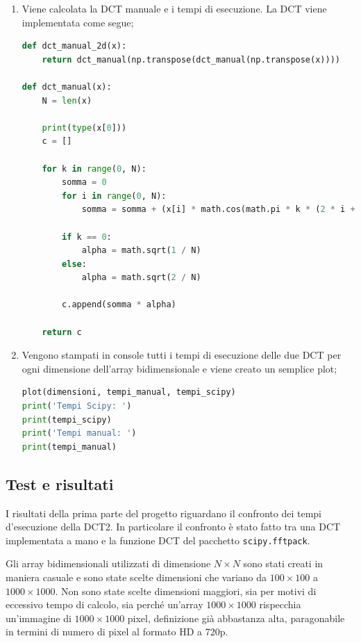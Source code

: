 \documentclass[preprint,12pt]{elsarticle}
\begin{document}
\begin{enumerate}
\item Viene calcolata la DCT manuale e i tempi di esecuzione. La DCT viene implementata come segue;
\begin{lstlisting}[language=Python]
def dct_manual_2d(x):
    return dct_manual(np.transpose(dct_manual(np.transpose(x))))
    
def dct_manual(x):
    N = len(x)

    print(type(x[0]))
    c = []
    
    for k in range(0, N):
        somma = 0
        for i in range(0, N):
            somma = somma + (x[i] * math.cos(math.pi * k * (2 * i + 1) / (2 * N)))
    
        if k == 0:
            alpha = math.sqrt(1 / N)
        else:
            alpha = math.sqrt(2 / N)
            
        c.append(somma * alpha)
            
    return c
\end{lstlisting}

\item Vengono stampati in console tutti i tempi di esecuzione delle due DCT per ogni dimensione dell'array bidimensionale e viene creato un semplice plot;
\begin{lstlisting}[language=Python]
plot(dimensioni, tempi_manual, tempi_scipy)
print('Tempi Scipy: ')
print(tempi_scipy)
print('Tempi manual: ')
print(tempi_manual)
\end{lstlisting}


\end{enumerate}

\newpage


\subsection*{Test e risultati}
I risultati della prima parte del progetto riguardano il confronto dei tempi d'esecuzione della DCT2. In particolare il confronto è stato fatto tra una DCT implementata a mano e la funzione DCT del pacchetto \texttt{scipy.fftpack}.

Gli array bidimensionali utilizzati di dimensione $N \times N$ sono stati creati in maniera casuale e sono state scelte dimensioni che variano da $100 \times 100$ a $1000 \times 1000$. Non sono state scelte dimensioni maggiori, sia per motivi di eccessivo tempo di calcolo, sia perché un'array $1000 \times 1000$ rispecchia un'immagine di $1000 \times 1000$ pixel, definizione già abbastanza alta, paragonabile in termini di numero di pixel al formato HD a 720p.
\end{document}
